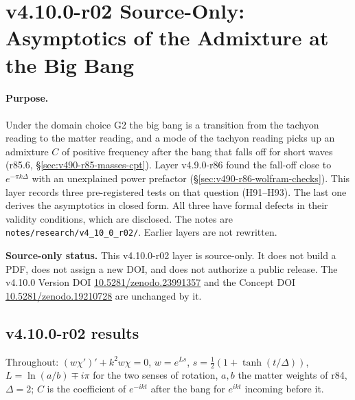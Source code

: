 \clearpage
\section*{v4.10.0-r02 Source-Only: Asymptotics of the Admixture at the Big Bang}
\label{sec:v4100-r02-admixture-asymptotics}

\paragraph{Purpose.}
Under the domain choice G2 the big bang is a transition from the tachyon reading to the matter reading, and a mode of the tachyon
reading picks up an admixture \(C\) of positive frequency after the bang that falls off for short waves (r85.6, \S\ref{sec:v490-r85-masses-cpt}).
Layer v4.9.0-r86 found the fall-off close to \(e^{-\pi k\Delta}\) with an unexplained power prefactor (\S\ref{sec:v490-r86-wolfram-checks}).
This layer records three pre-registered tests on that question (H91--H93).  The last one derives the asymptotics in closed form.  All three have
formal defects in their validity conditions, which are disclosed.  The notes are
\texttt{notes/\allowbreak research/\allowbreak v4\_10\_0\_r02/}.  Earlier layers are not rewritten.

\noindent\textbf{Source-only status.}
This v4.10.0-r02 layer is source-only.  It does not build a PDF, does not assign a new DOI,
and does not authorize a public release.  The v4.10.0 Version DOI
\href{https://doi.org/10.5281/zenodo.23991357}{10.5281/zenodo.23991357} and the Concept DOI
\href{https://doi.org/10.5281/zenodo.19210728}{10.5281/zenodo.19210728} are unchanged by it.

\subsection*{v4.10.0-r02 results}
\label{subsec:v4100-r02-results}

Throughout: \((w\chi')'+k^2w\chi=0\), \(w=e^{Ls}\), \(s=\tfrac12(1+\tanh(t/\Delta))\), \(L=\ln(a/b)\mp i\pi\) for the two senses of rotation, \(a,b\) the
matter weights of r84, \(\Delta=2\); \(C\) is the coefficient of \(e^{-ikt}\) after the bang for \(e^{ikt}\) incoming before it.

